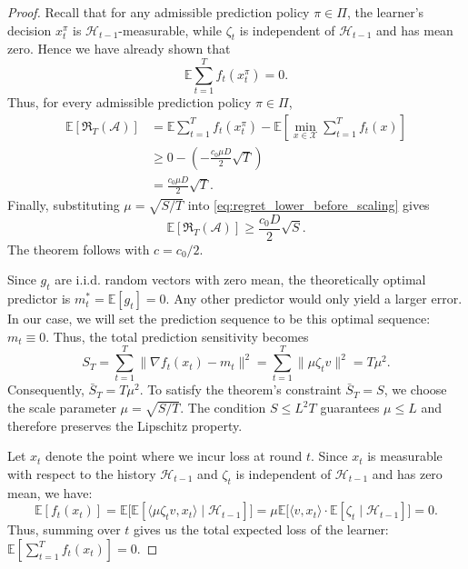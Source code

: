 \documentclass[journal,onecolumn]{IEEEtran}
\newcommand{\cA}{\mathcal{A}}
\newcommand{\cX}{\mathcal{X}}
\theoremstyle{plain}
\theoremstyle{definition}
\theoremstyle{remark}
\newcommand{\regret}{\mathfrak{R}}
\begin{document}
{\begin{proof}
Recall that for any admissible prediction policy $\pi\in\Pi$, the learner's
decision $x_t^\pi$ is $\mathcal H_{t-1}$-measurable, while $\zeta_t$ is independent
of $\mathcal H_{t-1}$ and has mean zero. Hence we have already shown that
\begin{equation*}
    \mathbb E\sum_{t=1}^T f_t(x_t^\pi)=0 .
\end{equation*}
Thus, for every admissible prediction policy $\pi\in\Pi$,
\begin{equation}
\begin{aligned}
    \mathbb E[\regret_T(\cA)]
    &=
    \mathbb E\sum_{t=1}^T f_t(x_t^\pi)
    -
    \mathbb E\left[
        \min_{x\in\cX}
        \sum_{t=1}^T f_t(x)
    \right]  \\
    &\ge
    0
    -
    \left(
        -\frac{c_0\mu D}{2}\sqrt T
    \right)  \\
    &=
    \frac{c_0\mu D}{2}\sqrt T .
\end{aligned}
\label{eq:regret_lower_before_scaling}
\end{equation}
Finally, substituting $\mu=\sqrt{S/T}$ into
\eqref{eq:regret_lower_before_scaling} gives
\begin{equation*}
    \mathbb E[\regret_T(\cA)]
    \ge
    \frac{c_0D}{2}\sqrt S .
\end{equation*}
The theorem follows with $c=c_0/2$.

\iffalse
Since $g_t$ are i.i.d. random vectors with zero mean, the theoretically optimal predictor is $m_t^* = \mathbb{E}[g_t] = 0$. Any other predictor would only yield a larger error.
In our case, we will set the prediction sequence to be this optimal sequence: $m_t \equiv 0$. 
Thus, the total prediction sensitivity becomes
\begin{equation*}
S_T = \sum_{t=1}^T \|\nabla f_t(x_t) - m_t\|^2 = \sum_{t=1}^T \|\mu \zeta_t v\|^2 = T\mu^2.
\end{equation*}
Consequently, $\bar S_T = T\mu^2$. To satisfy the theorem's constraint $\bar S_T = S$, we choose the scale parameter $\mu= \sqrt{S/T}$. The condition $S \le L^2T$ guarantees $\mu \le L$ and therefore preserves the Lipschitz property.

Let $x_t$ denote the point where we incur loss at round $t$. Since $x_t$ is measurable with respect to the history $\mathcal{H}_{t-1}$ and $\zeta_t$ is independent of $\mathcal{H}_{t-1}$ and has zero mean, we have:
\begin{equation*}
\mathbb{E}[f_t(x_t)]
= \mathbb{E}\big[\mathbb{E}[\langle \mu \zeta_t v, x_t \rangle \mid \mathcal{H}_{t-1}]\big]
= \mu \mathbb{E}\big[\langle v, x_t \rangle \cdot \mathbb{E}[\zeta_t \mid \mathcal{H}_{t-1}]\big]
= 0.
\end{equation*}
Thus, summing over $t$ gives us the total expected loss of the learner: $\mathbb{E}[\sum_{t=1}^T f_t(x_t)] = 0$.



\end{proof}}
\end{document}
